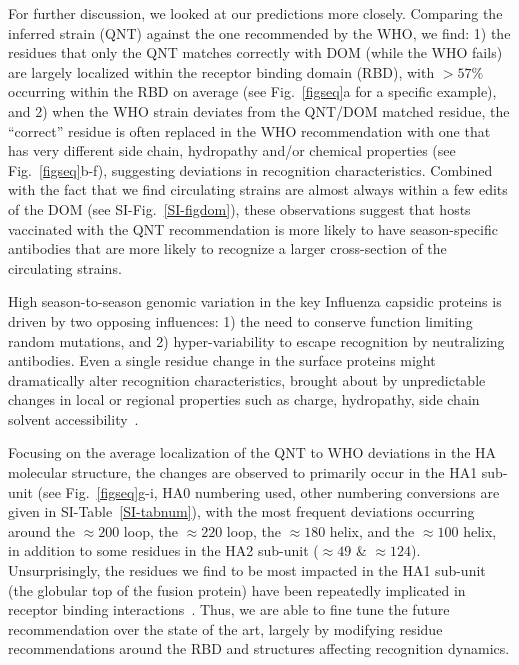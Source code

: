 \documentclass[onecolumn, compsoc,10pt]{IEEEtran}
\begin{document}
For further discussion, we looked at our \qnet predictions more closely. Comparing the \qnet inferred strain (QNT) against the one recommended by the WHO, we find: 1) the residues that only the QNT matches correctly with DOM (while the WHO fails) are largely localized within the receptor binding domain (RBD), with $>57\%$ occurring within  the RBD on average (see Fig.~\ref{figseq}a for a specific example), and 2) when the WHO strain deviates from  the QNT/DOM  matched residue, the ``correct'' residue is often replaced in the WHO recommendation with one that has very different side chain, hydropathy  and/or chemical properties (see Fig.~\ref{figseq}b-f), suggesting deviations in recognition characteristics. Combined with the fact that we find circulating strains are almost always within a few edits of the DOM (see SI-Fig.~\ref{SI-figdom}), these observations suggest that hosts vaccinated with the QNT recommendation is more likely to have season-specific antibodies that are more likely to recognize a larger cross-section of the circulating strains.

High season-to-season genomic variation in the key  Influenza capsidic proteins is driven by two opposing influences: 1) the need to conserve function  limiting random mutations, and 2) hyper-variability to escape recognition by neutralizing antibodies. Even a  single residue change in the surface proteins might dramatically alter recognition characteristics, brought about by unpredictable~\cite{carugo2001normalized,righetto2014comparative} changes in local or regional properties such as charge, hydropathy, side chain solvent accessibility~\cite{lee1971interpretation,shrake1973environment,momen2008impact,adamczak2005combining}.

Focusing on the average localization of the QNT to WHO deviations in the HA molecular  structure, the changes are observed to primarily occur in the HA1 sub-unit (see Fig.~\ref{figseq}g-i, HA0 numbering used, other numbering conversions are given in SI-Table~\ref{SI-tabnum}), with the most frequent deviations  occurring around the $\approx 200$ loop, the $\approx 220$ loop, the $\approx 180$ helix, and the $\approx 100$ helix, in addition to some residues in the HA2 sub-unit ($\approx 49$ \& $\approx 124$). Unsurprisingly, the residues we find to be most impacted in the HA1 sub-unit (the globular top of the fusion protein) have been repeatedly implicated in receptor binding interactions~\cite{tzarum2015structure,lazniewski2018structural,garcia2015dynamic}. Thus, we are able to fine tune the future recommendation over the state of the art, largely by modifying residue recommendations around the RBD and  structures affecting recognition dynamics.
\end{document}
